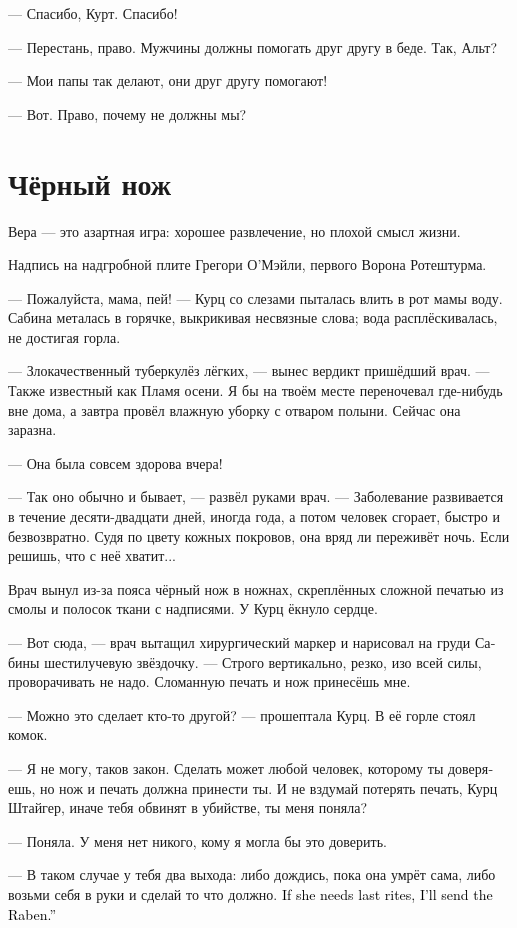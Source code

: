 \documentclass[a4paper,12pt,fleqn]{book}\usepackage{cooltooltips}\usepackage{polyglossia}\setdefaultlanguage[babelshorthands=true]{russian}\setotherlanguage{english}\defaultfontfeatures{Ligatures=TeX,Mapping=tex-text} \usepackage{xcolor}\definecolor{lightgray}{HTML}{bbbbbb}\color{lightgray}\newcommand{\ml}[3]{\textenglish{\textcolor{black}{#3}}}
\begin{document}
--- Спасибо, Курт.
Спасибо!

--- Перестань, право.
Мужчины должны помогать друг другу в беде.
Так, Альт?

--- Мои папы так делают, они друг другу помогают!

--- Вот.
Право, почему не должны мы?

\section{Чёрный нож}

\epigraph
{Вера --- это азартная игра: хорошее развлечение, но плохой смысл жизни.}
{Надпись на надгробной плите Грегори О'Мэйли, первого Ворона Ротештурма.}

--- Пожалуйста, мама, пей! --- Курц со слезами пыталась влить в рот мамы воду.
Сабина металась в горячке, выкрикивая несвязные слова;
вода расплёскивалась, не достигая горла.

--- Злокачественный туберкулёз лёгких, --- вынес вердикт пришёдший врач.
--- Также известный как Пламя осени.
Я бы на твоём месте переночевал где-нибудь вне дома, а завтра провёл влажную уборку с отваром полыни.
Сейчас она заразна.

--- Она была совсем здорова вчера!

--- Так оно обычно и бывает, --- развёл руками врач.
--- Заболевание развивается в течение десяти-двадцати дней, иногда года, а потом человек сгорает, быстро и безвозвратно.
Судя по цвету кожных покровов, она вряд ли переживёт ночь.
Если решишь, что с неё хватит...

Врач вынул из-за пояса чёрный нож в ножнах, скреплённых сложной печатью из смолы и полосок ткани с надписями.
У Курц ёкнуло сердце.

--- Вот сюда, --- врач вытащил хирургический маркер и нарисовал на груди Сабины шестилучевую звёздочку.
--- Строго вертикально, резко, изо всей силы, проворачивать не надо.
Сломанную печать и нож принесёшь мне.

--- Можно это сделает кто-то другой? --- прошептала Курц.
В её горле стоял комок.

--- Я не могу, таков закон.
Сделать может любой человек, которому ты доверяешь, но нож и печать должна принести ты.
И не вздумай потерять печать, Курц Штайгер, иначе тебя обвинят в убийстве, ты меня поняла?

--- Поняла.
У меня нет никого, кому я могла бы это доверить.

--- В таком случае у тебя два выхода: либо дождись, пока она умрёт сама, либо возьми себя в руки и сделай то что должно.
\ml{$0$}
{Если нужно отпеть --- я могу прислать Ворона.}
{If she needs last rites, I'll send the Raben.''}
\end{document}
